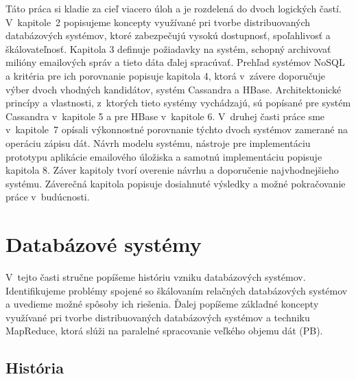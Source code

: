 \documentclass[11pt,twoside,a4paper]{book}
\begin{document}
Táto práca si kladie za cieľ viacero úloh a je rozdelená do dvoch logických častí. V~kapitole~2 popisujeme koncepty využívané pri tvorbe distribuovaných databázových systémov, ktoré zabezpečujú vysokú dostupnosť, spoľahlivosť a škálovateľnosť. Kapitola 3 definuje požiadavky na systém, schopný archivovať milióny emailových správ a tieto dáta ďalej spracúvať. Prehľad systémov NoSQL a kritéria pre ich porovnanie popisuje kapitola 4, ktorá v~závere doporučuje výber dvoch vhodných kandidátov, systém Cassandra a HBase. Architektonické princípy a vlastnosti, z~ktorých tieto systémy vychádzajú, sú popísané pre systém Cassandra v~kapitole 5 a pre HBase v~kapitole 6.
V~druhej časti práce sme v~kapitole~7 opísali výkonnostné porovnanie týchto dvoch systémov zamerané na operáciu zápisu dát. Návrh modelu systému,
nástroje pre implementáciu prototypu aplikácie emailového úložiska a samotnú implementáciu popisuje kapitola 8. Záver kapitoly tvorí overenie návrhu a doporučenie najvhodnejšieho systému. Záverečná kapitola popisuje dosiahnuté výsledky a možné pokračovanie práce v~budúcnosti.







\chapter{Databázové systémy}

V~tejto časti stručne popíšeme históriu vzniku databázových systémov. Identifikujeme problémy spojené so škálovaním relačných databázových systémov a uvedieme možné spôsoby ich riešenia. Ďalej popíšeme základné koncepty využívané pri tvorbe distribuovaných databázových systémov a techniku MapReduce, ktorá slúži na paralelné spracovanie veľkého objemu dát (PB).

\section{História}
\end{document}
